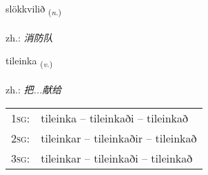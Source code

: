 \documentclass[frontgrid, backgrid]{flacards}\usepackage[]{graphicx}\usepackage[]{xcolor}
\begin{document}
\renewcommand{\blhead}{\vskip5pt {\small\bfseries\footnotesize Nafnorð | 名词 }}
\renewcommand{\bcfoot}{\vskip5pt \hspace{2pt}{\small\bfseries\footnotesize 3K}}


{slökkvilið \small{\textsubscript{(\textit{n.})}} \\[1ex] %
\textphonetic{[stlœhkvɪlɪð]} \\
zh.: \emph{消防队} \\  [2ex]
\renewcommand*{\arraystretch}{0.8}
}

\renewcommand{\flhead}{\vskip5pt \fboxsep=0pt {\small\bfseries\footnotesize Sagnorð | 动词}}
\renewcommand{\fcfoot}{\vskip5pt \fboxsep=0pt \hspace{2pt}{\small\bfseries\footnotesize 3K}}

\renewcommand{\blhead}{\vskip5pt {\small\bfseries\footnotesize Sagnorð | 动词 }}
\renewcommand{\bcfoot}{\vskip5pt \hspace{2pt}{\small\bfseries\footnotesize 3K}}


{tileinka \small{\textsubscript{(\textit{v.})}} \\[1ex] %
\textphonetic{[tʰɪːleiŋ̥ka]} \\
zh.: \emph{把...献给} \\  [2ex]
\renewcommand*{\arraystretch}{0.8}
\begin{tabular}{p{1cm}l}
\textsc{1sg}: & tileinka -- tileinkaði -- tileinkað \\ 
\textsc{2sg}: & tileinkar -- tileinkaðir -- tileinkað \\ 
\textsc{3sg}: & tileinkar -- tileinkaði -- tileinkað \\ 
\end{tabular}
}
\end{document}
